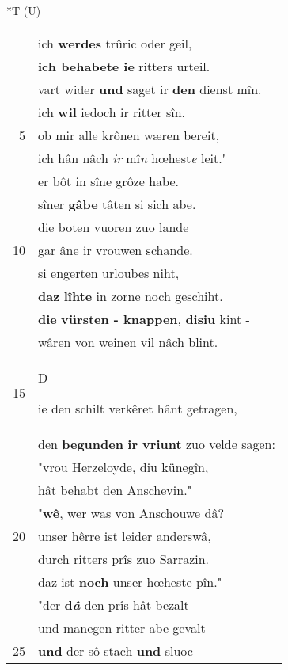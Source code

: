 \documentclass[8pt,a4paper,notitlepage]{article}
\begin{document}
\begin{table}[ht]
\begin{minipage}[t]{0.5\linewidth}
\end{minipage}
\hspace{0.5cm}
\begin{minipage}[t]{0.5\linewidth}
\small
\begin{center}*T (U)
\end{center}
\begin{tabular}{rl}
 & ich \textbf{werdes} trûric oder geil,\\ 
 & \textbf{ich behabete ie} ritters urteil.\\ 
 & vart wider \textbf{und} saget ir \textbf{den} dienst mîn.\\ 
 & ich \textbf{wil} iedoch ir ritter sîn.\\ 
5 & ob mir alle krônen wæren bereit,\\ 
 & ich hân nâch \textit{ir} mî\textit{n} hœhest\textit{e} leit."\\ 
 & er bôt in sîne grôze habe.\\ 
 & sîner \textbf{gâbe} tâten si sich abe.\\ 
 & die boten vuoren zuo lande\\ 
10 & gar âne ir vrouwen schande.\\ 
 & si engerten urloubes niht,\\ 
 & \textbf{daz} \textbf{lîhte} in zorne noch geschiht.\\ 
 & \textbf{die} \textbf{vürsten - knappen}, \textbf{disiu} kint -\\ 
 & wâren von weinen vil nâch blint.\\ 
15 & \begin{large}D\end{large}ie den schilt verkêret hânt getragen,\\ 
 & den \textbf{begunden} \textbf{ir vriunt} zuo velde sagen:\\ 
 & "vrou Herzeloyde, diu künegîn,\\ 
 & hât behabt den Anschevin."\\ 
 & "\textbf{wê}, wer was von Anschouwe dâ?\\ 
20 & unser hêrre ist leider anderswâ,\\ 
 & durch ritters prîs zuo Sarrazin.\\ 
 & daz ist \textbf{noch} unser hœheste pîn."\\ 
 & "der \textbf{d\textit{â}} den prîs hât bezalt\\ 
 & und manegen ritter abe gevalt\\ 
25 & \textbf{und} der sô stach \textbf{und} sluoc\\ 

\end{tabular}
\end{minipage}
\end{table}
\end{document}
